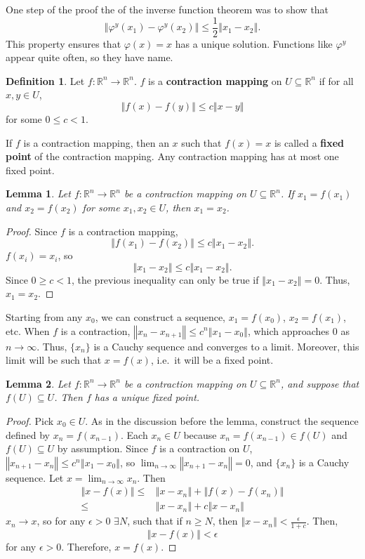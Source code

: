 \documentclass[12pt,reqno]{amsart}
\newtheorem{lemma}{Lemma}[section]
\theoremstyle{definition}
\newtheorem{definition}{Definition}[section]
\def\R{\mathbb{R}}
\newcommand{\norm}[1]{\left\Vert {#1} \right\Vert}
\renewcommand{\to}{{\rightarrow}}
\begin{document}
One step of the proof the of the inverse function theorem was to show that 
\[ \norm{\varphi^y(x_1) - \varphi^y(x_2)} \leq \frac{1}{2} \norm{x_1 - x_2}. \] 
This property ensures that $\varphi(x) = x$ has a unique
solution. Functions like $\varphi^y$ appear quite often, so they have
name.
\begin{definition}
  Let $f:\R^n \to \R^n$. $f$ is a \textbf{contraction mapping} on $U
  \subseteq \R^n$ if for all $x,y \in U$, 
  \[ \norm{f(x) - f(y)} \leq c \norm{x - y} \]
  for some $0 \leq c < 1$.
\end{definition}
If $f$ is a contraction mapping, then an $x$ such that $f(x) = x$ is
called a \textbf{fixed point} of the contraction mapping. Any
contraction mapping has at most one fixed point.
\begin{lemma}
  Let $f:\R^n \to \R^n$ be a contraction mapping on $U \subseteq
  \R^n$. If $x_1 = f(x_1)$ and $x_2 = f(x_2)$ for some $x_1, x_2 \in
  U$, then $x_1 = x_2$.
\end{lemma}
\begin{proof}
  Since $f$ is a contraction mapping, 
  \[ \norm{f(x_1) - f(x_2)} \leq c \norm{x_1 - x_2}. \]
  $f(x_i) = x_i$, so
  \[ \norm{x_1 - x_2} \leq c \norm{x_1 - x_2}. \]
  Since $0 \geq c < 1$, the previous inequality can only be true if
  $\norm{x_1 - x_2} = 0$. Thus, $x_1 = x_2$.
\end{proof}
Starting from any $x_0$, we can construct a sequence, $x_1 = f(x_0)$,
$x_2 = f(x_1)$, etc. When $f$ is a contraction, $\norm{x_n - x_{n+1}}
\leq c^n \norm{x_1 - x_0}$, which approaches $0$ as $n \to
\infty$. Thus, $\{x_n\}$ is a Cauchy sequence and converges to a
limit. Moreover, this limit will be such that $x = f(x)$, i.e.\ it
will be a fixed point. 
\begin{lemma}
  Let $f: \R^n \to \R^n$ be a contraction mapping on $U \subseteq
  \R^n$, and suppose that $f(U) \subseteq U$.  Then $f$ has a unique
  fixed point.
\end{lemma}
\begin{proof}
  Pick $x_0 \in U$. As in the discussion before the lemma, construct
  the sequence defined by $x_n = f(x_{n-1})$. Each $x_n \in U$ because
  $x_n = f(x_{n-1}) \in f(U)$ and $f(U) \subseteq U$ by
  assumption. Since $f$ is a contraction on $U$, $\norm{x_{n+1} - x_{n}}
  \leq c^n \norm{x_1 - x_0}$, so $\lim_{n \to \infty} \norm{x_{n+1} -
    x_{n}} = 0$, and $\{x_n\}$ is a Cauchy sequence. Let $x = \lim_{n
    \to \infty} x_n$. Then 
  \begin{align*}
    \norm{x - f(x)} \leq & \norm{x - x_n} + \norm{f(x) - f(x_n)} \\
    \leq & \norm{x - x_n} + c\norm{x - x_n}
  \end{align*}
  $x_n \to x$, so for any $\epsilon > 0$ $\exists N$, such that if $n
  \geq N$, then $\norm{x - x_n} < \frac{\epsilon}{1+c}$. Then,
  \[ \norm{x - f(x)} < \epsilon \]
  for any $\epsilon>0$. Therefore, $x = f(x)$. 
\end{proof}
\end{document}
